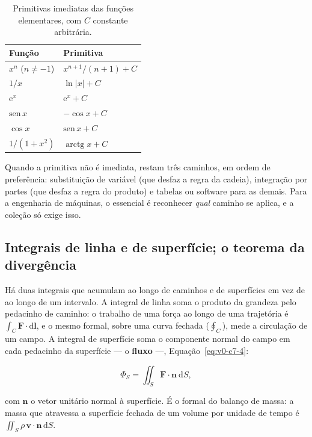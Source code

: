 \documentclass[12pt,a4paper]{article}
\numberwithin{equation}{section}
\numberwithin{table}{section}
\numberwithin{figure}{section}
\begin{document}
\begin{table}[H]
\centering
\caption[Primitivas das funções elementares.]{%
Primitivas imediatas das funções elementares, com $C$ constante arbitrária.}
\label{tab:v0-c7-1}
\begin{tabularx}{\textwidth}{lX}
\toprule
\textbf{Função} & \textbf{Primitiva} \\
\midrule
$x^n$ ($n \neq -1$) & $x^{n+1}/(n+1) + C$ \\
$1/x$ & $\ln|x| + C$ \\
$\mathrm{e}^{x}$ & $\mathrm{e}^{x} + C$ \\
$\mathrm{sen}\,x$ & $-\cos x + C$ \\
$\cos x$ & $\mathrm{sen}\,x + C$ \\
$1/(1+x^2)$ & $\operatorname{arctg} x + C$ \\
\bottomrule
\end{tabularx}
\end{table}

Quando a primitiva não é imediata, restam três caminhos, em ordem de
preferência: substituição de variável (que desfaz a regra da cadeia),
integração por partes (que desfaz a regra do produto) e tabelas ou
software para as demais. Para a engenharia de máquinas, o essencial é
reconhecer \emph{qual} caminho se aplica, e a coleção só exige isso.

\subsection{Integrais de linha e de superfície; o teorema da divergência}

Há duas integrais que acumulam ao longo de caminhos e de superfícies em
vez de ao longo de um intervalo. A integral de linha soma o produto da
grandeza pelo pedacinho de caminho: o trabalho de uma força ao longo de
uma trajetória é $\int_C \bm{F}\cdot\mathrm{d}\bm{l}$, e o mesmo formal,
sobre uma curva fechada ($\oint_C$), mede a circulação de um campo. A
integral de superfície soma o componente normal do campo em cada
pedacinho da superfície --- o \textbf{fluxo} ---, Equação~\eqref{eq:v0-c7-4}:

\begin{equation}\label{eq:v0-c7-4}
\Phi_S = \iint_S \bm{F}\cdot\bm{n}\ \mathrm{d}S,
\end{equation}

com $\bm{n}$ o vetor unitário normal à superfície. É o formal do balanço
de massa: a massa que atravessa a superfície fechada de um volume por
unidade de tempo é $\iint_S \rho\,\bm{v}\cdot\bm{n}\,\mathrm{d}S$.
\end{document}
